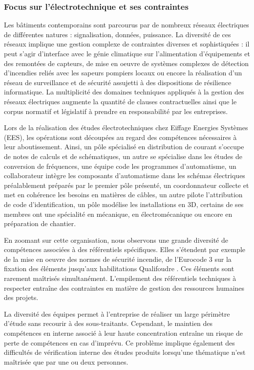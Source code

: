 \documentclass[a4paper,12pt]{article}
\begin{document}
\subsubsection{Focus sur l’électrotechnique et ses contraintes}
\label{sec:org5752bb9}
Les bâtiments contemporains sont parcourus par de nombreux réseaux électriques de différentes natures : signalisation, données, puissance. La diversité de ces réseaux implique une gestion complexe de contraintes diverses et sophistiquées : il peut s'agir d'interface avec le génie climatique sur l'alimentation d'équipements et des remontées de capteurs, de mise en oeuvre de systèmes complexes de détection d'incendies reliés avec les sapeurs pompiers locaux ou encore la réalisation d'un réseau de surveillance et de sécurité assujetti à des dispositions de résilience informatique. La multiplicité des domaines techniques appliqués à la gestion des réseaux électriques augmente la quantité de clauses contractuelles ainsi que le corpus normatif et législatif à prendre en responsabilité par les entreprises. 

Lors de la réalisation des études électrotechniques chez Eiffage Energies Systèmes (EES), les opérations sont découpées au regard des compétences nécessaires à leur aboutissement. Ainsi, un pôle spécialisé en distribution de courant s’occupe de notes de calculs et de schématiques, un autre se spécialise dans les études de conversion de fréquences, une équipe code les programmes d’automatisme, un collaborateur intègre les composants d’automatisme dans les schémas électriques préalablement préparés par le premier pôle présenté, un coordonnateur collecte et met en cohérence les besoins en matières de câbles, un autre pilote l’attribution de code d’identification, un pôle modélise les installations en 3D, certains de ses membres ont une spécialité en mécanique, en électromécanique ou encore en préparation de chantier. 

En zoomant sur cette organisation, nous observons une grande diversité de compétences associées à des référentiels spécifiques. Elles s’étendent par exemple de la mise en oeuvre des normes de sécurité incendie, de l’Eurocode 3 \autocite{icabEurocodesCodesConstructiona} sur la fixation des éléments jusqu’aux habilitations Qualifoudre \autocite{charpentierReferentielPourCertificationa}. Ces éléments sont rarement maîtrisés simultanément. L’empilement des référentiels techniques à respecter entraîne des contraintes en matière de gestion des ressources humaines des projets.

La diversité des équipes permet à l’entreprise de réaliser un large périmètre d’étude sans recourir à des sous-traitants. Cependant, le maintien des compétences en interne associé à leur haute concentration entraîne un risque de perte de compétences en cas d’imprévu. Ce problème implique également des difficultés de vérification interne des études produits lorsqu’une thématique n’est maîtrisée que par une ou deux personnes.
\end{document}
